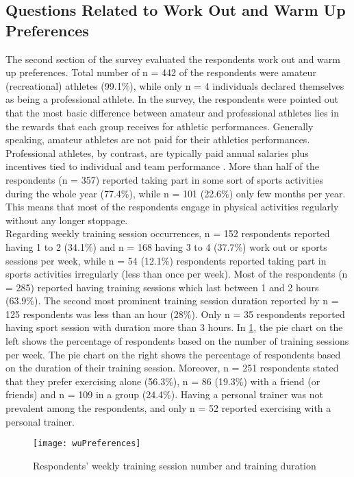 \subsection{Questions Related to Work Out and Warm Up Preferences}
The second section of the survey evaluated the respondents work out and warm up preferences. Total number of n = 442 of the respondents were amateur (recreational) athletes (99.1\%), while only n = 4 individuals declared themselves as being a professional athlete. In the survey, the respondents were pointed out that the most basic difference between amateur and professional athletes lies in the rewards that each group receives for athletic performances. Generally speaking, amateur athletes are not paid for their athletics performances. Professional athletes, by contrast, are typically paid annual salaries plus incentives tied to individual and team performance \cite{amateurvsproffesional}. More than half of the respondents (n = 357) reported taking part in some sort of sports activities during the whole year (77.4\%), while n = 101 (22.6\%) only few months per year. This means that most of the respondents engage in physical activities regularly without any longer stoppage.\\Regarding weekly training session occurrences, n = 152 respondents reported having 1 to 2 (34.1\%) and n = 168 having 3 to 4 (37.7\%) work out or sports sessions per week, while n = 54 (12.1\%) respondents reported taking part in sports activities irregularly (less than once per week). Most of the respondents (n = 285) reported having training sessions which last between 1 and 2 hours (63.9\%). The second most prominent training session duration reported by n = 125 respondents was less than an hour (28\%). Only n = 35 respondents reported having sport session with duration more than 3 hours. In \ref{fig:wuPreferences}, the pie chart on the left shows the percentage of respondents based on the number of training sessions per week. The pie chart on the right shows the percentage of respondents based on the duration of their training session. Moreover, n = 251 respondents stated that they prefer exercising alone (56.3\%), n = 86 (19.3\%) with a friend (or friends) and n = 109 in a group (24.4\%). Having a personal trainer was not prevalent among the respondents, and only n = 52 reported exercising with a personal trainer. 
\begin{figure}[h]
    \centering
    \texttt{[image: wuPreferences]}
    \caption{Respondents' weekly training session number and training duration}
    \label{fig:wuPreferences}
\end{figure}\\

